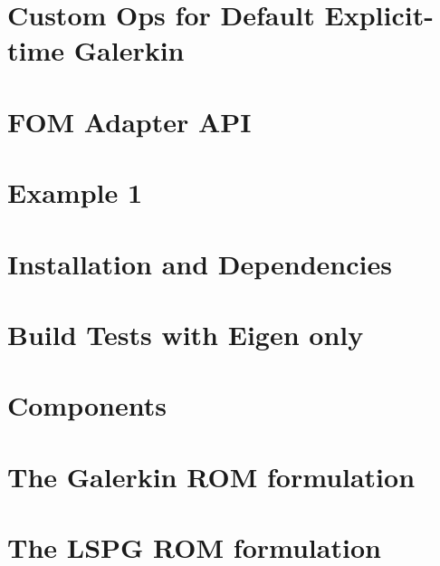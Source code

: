 \let\mypdfximage\pdfximage\def\pdfximage{\immediate\mypdfximage}\documentclass[twoside]{book}
\newcommand{\+}{\discretionary{\mbox{\scriptsize$\hookleftarrow$}}{}{}}
\begin{document}
\chapter{Custom Ops for Default Explicit-\/time Galerkin}
\label{md_pages_old_custom_ops_default_gal_exp}

\chapter{FOM Adapter API}
\label{md_pages_old_custom_ops}

\chapter{Example 1}
\label{md_pages_old_examples_example1}

\chapter{Installation and Dependencies}
\label{md_pages_old_getstarted_build_and_install}

\chapter{Build Tests with Eigen only}
\label{md_pages_old_getstarted_build_tests_eigen}

\chapter{Components}
\label{md_pages_old_getstarted_packages}

\chapter{The Galerkin ROM formulation}
\label{md_pages_old_various_formulation_galerkin}

\chapter{The LSPG ROM formulation}
\label{md_pages_old_various_formulation_lspg}

\end{document}
